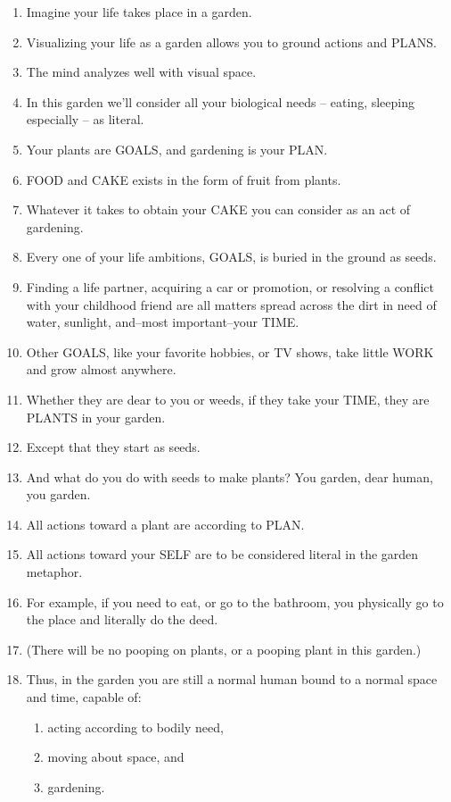 \documentclass[
]{book}
\providecommand{\tightlist}{%
  \setlength{\itemsep}{0pt}\setlength{\parskip}{0pt}}
\begin{document}
\begin{enumerate}
\def\labelenumi{\arabic{enumi}.}
\tightlist
\item
  Imagine your life takes place in a garden.
\item
  Visualizing your life as a garden allows you to ground actions and PLANS.
\item
  The mind analyzes well with visual space.
\item
  In this garden we'll consider all your biological needs -- eating, sleeping especially -- as literal.
\item
  Your plants are GOALS, and gardening is your PLAN.
\item
  FOOD and CAKE exists in the form of fruit from plants.
\item
  Whatever it takes to obtain your CAKE you can consider as an act of gardening.
\item
  Every one of your life ambitions, GOALS, is buried in the ground as seeds.
\item
  Finding a life partner, acquiring a car or promotion, or resolving a conflict with
  your childhood friend are all matters spread across the dirt in need of water,
  sunlight, and--most important--your TIME.
\item
  Other GOALS, like your favorite hobbies, or TV shows, take little WORK and
  grow almost anywhere.
\item
  Whether they are dear to you or weeds, if they take your TIME, they are PLANTS
  in your garden.
\item
  Except that they start as seeds.
\item
  And what do you do with seeds to make plants? You garden, dear human, you
  garden.
\item
  All actions toward a plant are according to PLAN.
\item
  All actions toward your SELF are to be considered literal in the garden
  metaphor.
\item
  For example, if you need to eat, or go to the bathroom, you physically go to the
  place and literally do the deed.
\item
  (There will be no pooping on plants, or a pooping plant in this garden.)
\item
  Thus, in the garden you are still a normal human bound to a normal space and
  time, capable of:

  \begin{enumerate}
  \def\labelenumii{\arabic{enumii}.}
  \tightlist
  \item
    acting according to bodily need,
  \item
    moving about space, and
  \item
    gardening.
  \end{enumerate}
\end{enumerate}
\end{document}
